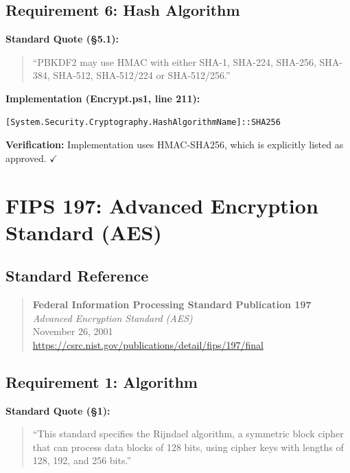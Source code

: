 \documentclass[11pt,letterpaper]{article}
\begin{document}
\subsection{Requirement 6: Hash Algorithm}

\textbf{Standard Quote (§5.1):}
\begin{quote}
``PBKDF2 may use HMAC with either SHA-1, SHA-224, SHA-256, SHA-384, SHA-512, SHA-512/224 or SHA-512/256.''
\end{quote}

\begin{samepage}
\textbf{Implementation (Encrypt.ps1, line 211):}
\begin{lstlisting}[language=bash]
[System.Security.Cryptography.HashAlgorithmName]::SHA256
\end{lstlisting}
\textbf{Verification:} Implementation uses HMAC-SHA256, which is explicitly listed as approved. $\checkmark$
\end{samepage}

\newpage
\section{FIPS 197: Advanced Encryption Standard (AES)}

\subsection{Standard Reference}

\begin{quote}
\textbf{Federal Information Processing Standard Publication 197} \\
\textit{Advanced Encryption Standard (AES)} \\
November 26, 2001 \\
\url{https://csrc.nist.gov/publications/detail/fips/197/final}
\end{quote}

\subsection{Requirement 1: Algorithm}

\textbf{Standard Quote (§1):}
\begin{quote}
``This standard specifies the Rijndael algorithm, a symmetric block cipher that can process data blocks of 128 bits, using cipher keys with lengths of 128, 192, and 256 bits.''
\end{quote}
\end{document}
